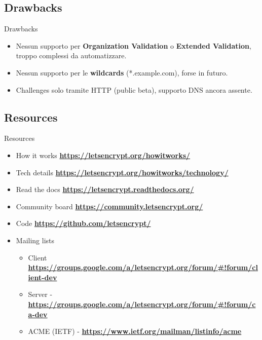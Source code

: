 \documentclass[xcolor=svgnames,11pt]{beamer}
\begin{document}
\subsection{Drawbacks}
\begin{frame}{Drawbacks}
\begin{itemize}
  \item Nessun supporto per \textbf{Organization Validation} o \textbf{Extended
  Validation}, troppo complessi da automatizzare.
  \medskip\pause
  \item Nessun supporto per le \textbf{wildcards} (*.example.com), forse in futuro.
  \medskip\pause
  \item Challenges solo tramite HTTP (public beta), supporto DNS ancora assente.
\end{itemize}
\end{frame}

\subsection{Resources}
\begin{frame}{Resources}
\begin{small}
\begin{itemize}
  \item How it works \textbf{\url{https://letsencrypt.org/howitworks/}}
  \medskip
  \item Tech details \textbf{\url{https://letsencrypt.org/howitworks/technology/}}
  \medskip
  \item Read the docs \textbf{\url{https://letsencrypt.readthedocs.org/}}
  \medskip
  \item Community board \textbf{\url{https://community.letsencrypt.org/}}
  \medskip
  \item Code \textbf{\url{https://github.com/letsencrypt/}}
  \medskip
  \item Mailing lists
  \begin{itemize}
    \item Client \textbf{\url{https://groups.google.com/a/letsencrypt.org/forum/\#!forum/client-dev}}
    \item Server - \textbf{\url{https://groups.google.com/a/letsencrypt.org/forum/\#!forum/ca-dev}}
    \item ACME (IETF) - \textbf{\url{https://www.ietf.org/mailman/listinfo/acme}}
  \end{itemize}
\end{itemize}
\end{small}
\end{frame}
\end{document}
